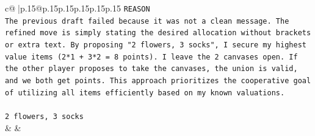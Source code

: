 \documentclass{article}
\begin{document}
{\begin{supertabular}{c@{$\;$}|p{.15\linewidth}@{}p{.15\linewidth}p{.15\linewidth}p{.15\linewidth}p{.15\linewidth}p{.15\linewidth}}
{{{\texttt{REASON} \\
\texttt{The previous draft failed because it was not a clean message. The refined move is simply stating the desired allocation without brackets or extra text. By proposing "2 flowers, 3 socks", I secure my highest value items (2*1 + 3*2 = 8 points). I leave the 2 canvases open. If the other player proposes to take the canvases, the union is valid, and we both get points. This approach prioritizes the cooperative goal of utilizing all items efficiently based on my known valuations.} \\
\\ 
\texttt{2 flowers, 3 socks} \\
            }
        }
    }
    & & \\ \\


\end{supertabular}}
\end{document}
